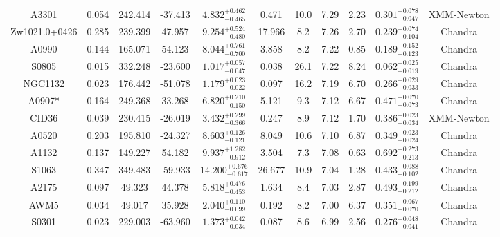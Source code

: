 \documentclass{aa}   %
\begin{document}
\begin{table}[h!]
\begin{center}
\begin{tabular}{ c  c  c  c c c c c c c c }
A3301               		&		0.054	&	242.414	&	-37.413	& $	4.832^{+0.462}_{-0.465}$  &      0.471	&  10.0	&	7.29	&	2.23	&	$ 0.301^{+0.078}_{-0.047}  $ &	  XMM-Newton  \\
Zw1021.0+0426       		&		0.285	&	239.399	&	47.957	& $	9.254^{+0.524}_{-0.480}$  &     17.966	&  8.2	&	7.26	&	2.70	&	$ 0.239^{+0.074}_{-0.104}  $ &	  Chandra     \\
A0990               		&		0.144	&	165.071	&	54.123	& $	8.044^{+0.761}_{-0.700}$  &      3.858	&  8.2	&	7.22	&	0.85	&	$ 0.189^{+0.152}_{-0.123}  $ &	  Chandra     \\
S0805               		&		0.015	&	332.248	&	-23.600	& $	1.017^{+0.057}_{-0.047}$  &      0.038	&  26.1	&	7.22	&	8.24	&	$ 0.062^{+0.025}_{-0.019}  $ &	Chandra       \\
NGC1132             		&		0.023	&	176.442	&	-51.078	& $	1.179^{+0.023}_{-0.022}$  &      0.097	&  16.2	&	7.19	&	6.70	&	$ 0.266^{+0.029}_{-0.033}  $ &	 Chandra      \\
A0907*              		&		0.164	&	249.368	&	33.268	& $	6.820^{+0.210}_{-0.150}$  &      5.121	&  9.3	&	7.12	&	6.67	&	$ 0.471^{+0.070}_{-0.073}  $ &	 Chandra      \\
CID36               		&		0.039	&	230.415	&	-26.019	& $	3.432^{+0.299}_{-0.366}$  &      0.247	&  8.9	&	7.12	&	1.70	&	$ 0.386^{+0.023}_{-0.034}  $ &	  XMM-Newton  \\
A0520               		&		0.203	&	195.810	&	-24.327	& $	8.603^{+0.126}_{-0.121}$  &      8.049	&  10.6	&	7.10	&	6.87	&	$ 0.349^{+0.023}_{-0.024}  $ &	 Chandra      \\
A1132               		&		0.137	&	149.227	&	54.182	& $	9.937^{+1.282}_{-0.912}$  &      3.504	&  7.3	&	7.08	&	0.63	&	$ 0.692^{+0.273}_{-0.213}  $ &	  Chandra     \\
S1063               		&		0.347	&	349.483	&	-59.933	& $ 14.200^{+0.676}_{-0.617}$ &     26.677	&  10.9	&	7.04	&	1.28	&	$ 0.433^{+0.088}_{-0.102}  $ &	  Chandra     \\
A2175               		&		0.097	&	49.323	&	44.378	& $	5.818^{+0.476}_{-0.453}$  &      1.634	&  8.4	&	7.03	&	2.87	&	$ 0.493^{+0.199}_{-0.212}  $ &	  Chandra     \\
AWM5                		&		0.034	&	49.017	&	35.928	& $	2.040^{+0.110}_{-0.099}$  &      0.192	&  8.2	&	7.00	&	6.37	&	$ 0.351^{+0.067}_{-0.070}  $ &	 Chandra      \\
S0301               		&		0.023	&	229.003	&	-63.960	& $	1.373^{+0.042}_{-0.034}$  &      0.087	&  8.6	&	6.99	&	2.56	&	$ 0.276^{+0.048}_{-0.041}  $ &	  Chandra     \\

\end{tabular}
\end{center}
\end{table}
\end{document}
